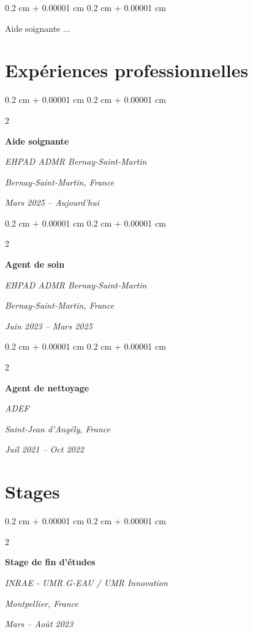 \documentclass[10pt, letterpaper]{article}
\newenvironment{onecolentry}{
  \begin{adjustwidth}{
    0.2 cm + 0.00001 cm
  }{
    0.2 cm + 0.00001 cm
  }
}{
  \end{adjustwidth}
} %
\newenvironment{twocolentry}[2][]{
  \onecolentry
  \def\secondColumn{#2}
  \setcolumnwidth{\fill, 4.9 cm}
  \begin{paracol}{2}
}{
  \switchcolumn \raggedleft \secondColumn
  \end{paracol}
  \endonecolentry
} %
\begin{document}
\begin{onecolentry}
  Aide soignante ...
\end{onecolentry}


\section{Expériences professionnelles}

  \begin{twocolentry}
    {
      \textit{Bernay-Saint-Martin, France}
      
      \textit{Mars 2025 – Aujourd'hui}
    } {
      \textbf{Aide soignante}

      \textit{EHPAD ADMR Bernay-Saint-Martin}
    }
  \end{twocolentry}

  \vspace{0.10 cm}

  \begin{twocolentry}
    {
      \textit{Bernay-Saint-Martin, France}
      
      \textit{Juin 2023 – Mars 2025}
    } {
      \textbf{Agent de soin}

      \textit{EHPAD ADMR Bernay-Saint-Martin}
    }
  \end{twocolentry}

  \vspace{0.10 cm}

  \begin{twocolentry}
    {
      \textit{Saint-Jean d'Angély, France}
      
      \textit{Juil 2021 – Oct 2022}
    } {
      \textbf{Agent de nettoyage}

      \textit{ADEF}
    }
  \end{twocolentry}

\vspace{0.2 cm}


\section{Stages}

  \begin{twocolentry} {
    \textit{Montpellier, France}
    
    \textit{Mars – Août 2023}
  } {
    \textbf{Stage de fin d'études}
    
    \textit{INRAE - UMR G-EAU / UMR Innovation}
  }
  \end{twocolentry}
\end{document}
